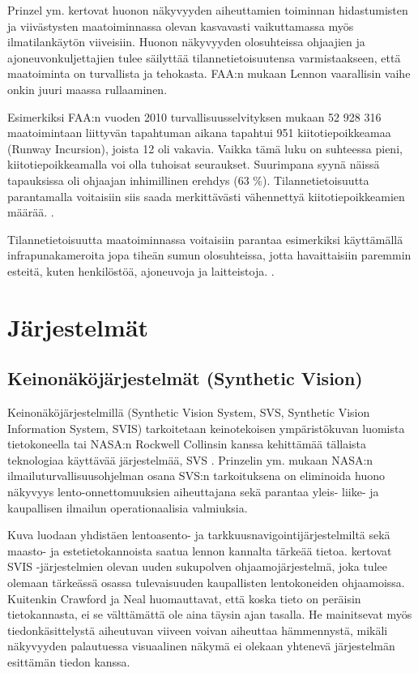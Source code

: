 \documentclass[utf8,bachelor,manualbib]{gradu3}
\begin{document}
Prinzel ym. \citeyearpar{prinzel2013} kertovat huonon näkyvyyden aiheuttamien toiminnan hidastumisten ja viivästysten maatoiminnassa olevan kasvavasti vaikuttamassa myös ilmatilankäytön viiveisiin. Huonon näkyvyyden olosuhteissa ohjaajien ja ajoneuvonkuljettajien tulee säilyttää tilannetietoisuutensa varmistaakseen, että maatoiminta on turvallista ja tehokasta. FAA:n mukaan \citeyearpar{gerold2001} Lennon vaarallisin vaihe onkin juuri maassa rullaaminen.

Esimerkiksi FAA:n vuoden 2010 turvallisuusselvityksen mukaan 52 928 316 maatoimintaan liittyvän tapahtuman aikana tapahtui 951 kiitotiepoikkeamaa (Runway Incursion), joista 12 oli vakavia. Vaikka tämä luku on suhteessa pieni, kiitotiepoikkeamalla voi olla tuhoisat seuraukset. Suurimpana syynä näissä tapauksissa oli ohjaajan inhimillinen erehdys (63 \%). Tilannetietoisuutta parantamalla voitaisiin siis saada merkittävästi vähennettyä kiitotiepoikkeamien määrää. \citep{prinzel2013}.

Tilannetietoisuutta maatoiminnassa voitaisiin parantaa esimerkiksi käyttämällä infrapunakameroita jopa tiheän sumun olosuhteissa, jotta havaittaisiin paremmin esteitä, kuten henkilöstöä, ajoneuvoja ja laitteistoja. \citep{beiergemperlein2004}.

\chapter{Järjestelmät}

\section{Keinonäköjärjestelmät (Synthetic Vision)}

Keinonäköjärjestelmillä (Synthetic Vision System, SVS, Synthetic Vision Information System, SVIS) tarkoitetaan keinotekoisen ympäristökuvan luomista  tietokoneella \citep{baileyym2007} tai NASA:n Rockwell Collinsin kanssa kehittämää tällaista teknologiaa käyttävää järjestelmää, SVS \citep{crawfordneal2006}. Prinzelin ym. \citeyearpar{prinzel2004} mukaan NASA:n ilmailuturvallisuusohjelman osana SVS:n tarkoituksena on eliminoida huono näkyvyys lento-onnettomuuksien aiheuttajana sekä parantaa yleis- liike- ja kaupallisen ilmailun operationaalisia valmiuksia.

Kuva luodaan yhdistäen lentoasento- ja tarkkuusnavigointijärjestelmiltä sekä maasto- ja estetietokannoista saatua lennon kannalta tärkeää tietoa. \cite{schnellym2004} kertovat SVIS -järjestelmien olevan uuden sukupolven ohjaamojärjestelmä, joka tulee olemaan tärkeässä osassa tulevaisuuden kaupallisten lentokoneiden ohjaamoissa. Kuitenkin Crawford ja Neal \citeyearpar{crawfordneal2006} huomauttavat, että koska tieto on peräisin tietokannasta, ei se välttämättä ole aina täysin ajan tasalla. He mainitsevat myös tiedonkäsittelystä aiheutuvan viiveen voivan aiheuttaa hämmennystä, mikäli näkyvyyden palautuessa visuaalinen näkymä ei olekaan yhtenevä järjestelmän esittämän tiedon kanssa.
\end{document}
